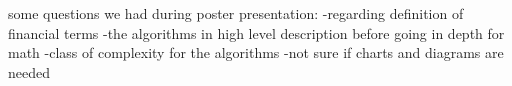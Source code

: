 some questions we had during poster presentation:
-regarding definition of financial terms
-the algorithms in high level description before going in depth for math
-class of complexity for the algorithms
-not sure if charts and diagrams are needed

